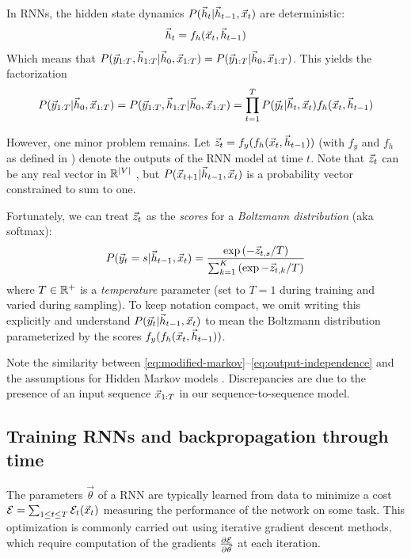 In RNNs, the hidden state dynamics $P(\vec{h}_t | \vec{h}_{t-1}, \vec{x}_t)$ are deterministic:
\begin{equation}
  \vec{h}_t = f_h(\vec{x}_t, \vec{h}_{t-1})
\end{equation}
Which means that $P(\vec{y}_{1:T}, \vec{h}_{1:T} | \vec{h}_0, \vec{x}_{1:T}) = P(\vec{y}_{1:T} | \vec{h}_0, \vec{x}_{1:T})$.
This yields the factorization
\begin{equation}
  P(\vec{y}_{1:T} | \vec{h}_0, \vec{x}_{1:T})
  = P(\vec{y}_{1:T}, \vec{h}_{1:T} | \vec{h}_0, \vec{x}_{1:T})
  = \prod_{t=1}^T P(\vec{y}_t | \vec{h}_t, \vec{x}_t) f_h(\vec{x}_t, \vec{h}_{t-1})
\end{equation}

However, one minor problem remains. Let $\vec{z}_t = f_y(f_h(\vec{x}_t, \vec{h}_{t-1}))$ (with
$f_y$ and $f_h$ as defined in ) denote the outputs of the RNN model
at time $t$. Note that $\vec{z}_t$ can be any real vector in $\mathbb{R}^{|V|}$
, but $P(\vec{x}_{t+1} | \vec{h}_{t-1}, \vec{x}_{t})$ is
a probability vector constrained to sum to one.

Fortunately, we can treat $\vec{z}_t$ as the \emph{scores} for a \emph{Boltzmann
distribution} (aka softmax):
\begin{equation}\label{eq:boltzmann-dist}
    P( \vec{y}_{t} = s | \vec{h}_{t-1}, \vec{x}_t )
    = \frac{\exp \left(-\vec{z}_{t,s}/T\right) }{ \sum_{k=1}^{K} \left(\exp -\vec{z}_{t,k}/T\right)}
\end{equation}
where $T \in \mathbb{R}^+$ is a \emph{temperature} parameter (set to $T=1$ during training and varied during sampling).
To keep notation compact, we omit writing this explicitly and understand $P(\vec{y}_t | \vec{h}_{t-1}, \vec{x}_t)$ to mean
the Boltzmann distribution parameterized by the scores $f_y(f_h(\vec{x}_t, \vec{h}_{t-1}))$.

Note the similarity between \cref{eq:modified-markov}--\cref{eq:output-independence}
and the assumptions for Hidden Markov models \citep{ramage2007hidden}. Discrepancies are due
to the presence of an input sequence $\vec{x}_{1:T}$ in our sequence-to-sequence model.



\subsection{Training RNNs and backpropagation through time}


The parameters $\vec{\theta}$ of a RNN are typically learned from data to
minimize a cost $\mathcal{E} = \sum_{1 \leq t \leq T} \mathcal{E}_t(\vec{x}_t)$
measuring the performance of the network on some task. This optimization is
commonly carried out using iterative gradient descent methods, which require
computation of the gradients $\frac{\partial \mathcal{E}}{\partial \vec{\theta}}$ at each
iteration.

